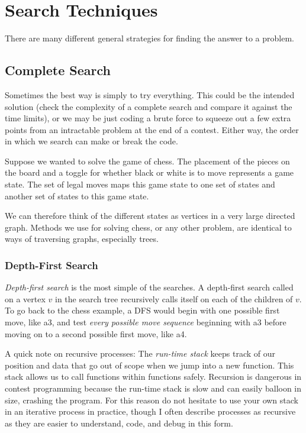 \documentclass[11pt]{book}
\begin{document}
\section{Search Techniques}

There are many different general strategies for finding the answer to a problem.

\subsection{Complete Search}

Sometimes the best way is simply to try everything. This could be the intended solution (check the complexity of a complete search and compare it against the time limits), or we may be just coding a brute force to squeeze out a few extra points from an intractable problem at the end of a contest. Either way, the order in which we search can make or break the code.

Suppose we wanted to solve the game of chess. The placement of the pieces on the board and a toggle for whether black or white is to move represents a game state. The set of legal moves maps this game state to one set of states and another set of states to this game state.

We can therefore think of the different states as vertices in a very large directed graph. Methods we use for solving chess, or any other problem, are identical to ways of traversing graphs, especially trees.

\subsubsection{Depth-First Search}

\textit{Depth-first search} is the most simple of the searches. A depth-first search called on a vertex $v$ in the search tree recursively calls itself on each of the children of $v$. To go back to the chess example, a DFS would begin with one possible first move, like a3, and test \textit{every possible move sequence} beginning with a3 before moving on to a second possible first move, like a4.

A quick note on recursive processes: The \textit{run-time stack} keeps track of our position and data that go out of scope when we jump into a new function. This stack allows us to call functions within functions safely. Recursion is dangerous in contest programming because the run-time stack is slow and can easily balloon in size, crashing the program. For this reason do not hesitate to use your own stack in an iterative process in practice, though I often describe processes as recursive as they are easier to understand, code, and debug in this form.
\end{document}
